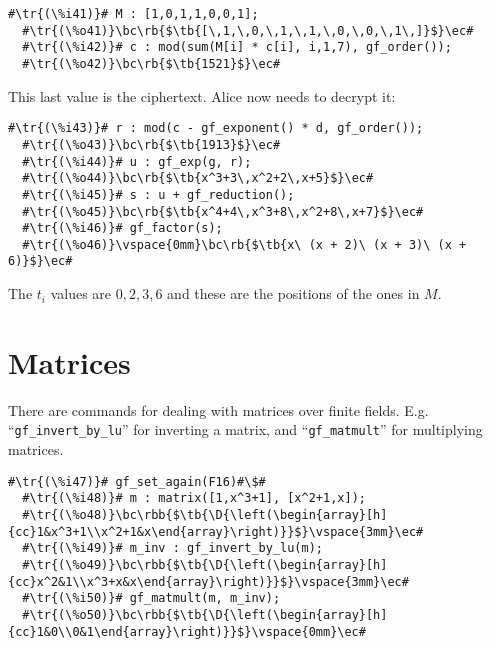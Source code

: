 \documentclass[a4paper,11pt,leqno,fleqn]{artikel3}
\newcommand{\D}{\displaystyle}
\newcommand{\bc}{\begin{center}}
\newcommand{\ec}{\end{center}}
\newcommand{\tr}[1]{\textcolor{red}{#1}}
\newcommand{\tb}[1]{\textcolor{blue}{#1}}
\newcommand{\rb}[1]{\raisebox{2mm}[0mm][1mm]{#1}}
\newcommand{\rbb}[1]{\raisebox{-4mm}[0mm][9mm]{#1}}
\begin{document}
\vspace*{2mm}
\begin{lstlisting}[escapechar=\#]
  #\tr{(\%i41)}# M : [1,0,1,1,0,0,1];
  #\tr{(\%o41)}\bc\rb{$\tb{[\,1,\,0,\,1,\,1,\,0,\,0,\,1\,]}$}\ec#
  #\tr{(\%i42)}# c : mod(sum(M[i] * c[i], i,1,7), gf_order());
  #\tr{(\%o42)}\bc\rb{$\tb{1521}$}\ec#
\end{lstlisting}

This last value is the ciphertext.  Alice now needs to decrypt it:

\vspace*{-4mm}
\begin{lstlisting}[escapechar=\#]
  #\tr{(\%i43)}# r : mod(c - gf_exponent() * d, gf_order());
  #\tr{(\%o43)}\bc\rb{$\tb{1913}$}\ec#
  #\tr{(\%i44)}# u : gf_exp(g, r);
  #\tr{(\%o44)}\bc\rb{$\tb{x^3+3\,x^2+2\,x+5}$}\ec#
  #\tr{(\%i45)}# s : u + gf_reduction();
  #\tr{(\%o45)}\bc\rb{$\tb{x^4+4\,x^3+8\,x^2+8\,x+7}$}\ec#
  #\tr{(\%i46)}# gf_factor(s);
  #\tr{(\%o46)}\vspace{0mm}\bc\rb{$\tb{x\ (x + 2)\ (x + 3)\ (x + 6)}$}\ec#
\end{lstlisting}

The $t_i$ values are $0,2,3,6$ and these are the positions of the ones in $M$.

\vspace*{-3mm}
\section*{Matrices}

There are commands for dealing with matrices over finite fields. E.g.
``\verb!gf_invert_by_lu!'' for inverting a matrix, and ``\verb!gf_matmult!'' for
multiplying matrices.

\vspace*{2mm}
\begin{lstlisting}[escapechar=\#]
  #\tr{(\%i47)}# gf_set_again(F16)#\$#
  #\tr{(\%i48)}# m : matrix([1,x^3+1], [x^2+1,x]);
  #\tr{(\%o48)}\bc\rbb{$\tb{\D{\left(\begin{array}[h]{cc}1&x^3+1\\x^2+1&x\end{array}\right)}}$}\vspace{3mm}\ec#
  #\tr{(\%i49)}# m_inv : gf_invert_by_lu(m);
  #\tr{(\%o49)}\bc\rbb{$\tb{\D{\left(\begin{array}[h]{cc}x^2&1\\x^3+x&x\end{array}\right)}}$}\vspace{3mm}\ec#
  #\tr{(\%i50)}# gf_matmult(m, m_inv);
  #\tr{(\%o50)}\bc\rbb{$\tb{\D{\left(\begin{array}[h]{cc}1&0\\0&1\end{array}\right)}}$}\vspace{0mm}\ec#
\end{lstlisting}
\end{document}
